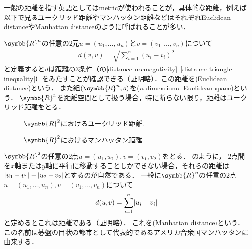 \documentclass{ltjsbook}
\begin{document}
一般の距離を指す英語としてはmetricが使われることが，具体的な距離，例えば以下で見るユークリッド距離やマンハッタン距離などはそれぞれEuclidean distanceやManhattan distanceのように呼ばれることが多い．

\begin{exa} \(\symbb{R}^n\)の任意の\(2\)元\(u = (u_1, \ldots, u_n)\)と\(v = (v_1, \ldots, v_n)\)について
\begin{align*}
    d(u, v) = \sqrt{\sum_{i = 1}^n (u_i - v_i)^2}
\end{align*}
と定義すると\(d\)は距離の\(3\)条件（の\ref{distance-nonnegativity}--\ref{distance-triangle-inequality}）をみたすことが確認できる（証明略）．この距離を(Euclidean distance)という．
また組\(\tuple{\symbb{R}^n, d}\)を(\(n\)-dimensional Euclidean space)という．
\(\symbb{R}^n\)を距離空間として扱う場合，特に断らない限り，距離はユークリッド距離をとる．
\end{exa}

\begin{figure}
\begin{minipage}{0.5\textwidth}
    \centering
    
    \caption{\(\symbb{R}^2\)におけるユークリッド距離．}
\end{minipage}
\begin{minipage}{0.5\textwidth}
    \centering
    
    \caption{\(\symbb{R}^2\)におけるマンハッタン距離．}
\end{minipage}
\end{figure}

\begin{exa}
\(\symbb{R}^2\)の任意の\(2\)点\(u = (u_1, u_2), v = (v_1, v_2)\)をとる．
のように，
\(2\)点間を\(x\)軸または\(y\)軸に平行に移動することしかできない場合，それらの距離は\(\lvert u_1 - v_1 \rvert + \lvert u_2 - v_2 \rvert\)とするのが自然である．
一般に\(\symbb{R}^n\)の任意の\(2\)点\(u = (u_1, \ldots, u_n), v = (v_1, \ldots, v_n)\)について
\begin{align*}
    d(u, v) = \sum_{i = 1}^n \lvert u_i - v_i \rvert
\end{align*}
と定めるとこれは距離である（証明略）．
これを(Manhattan distance)という．
この名前は碁盤の目状の都市として代表的であるアメリカ合衆国マンハッタンに由来する．

\end{exa}
\end{document}
